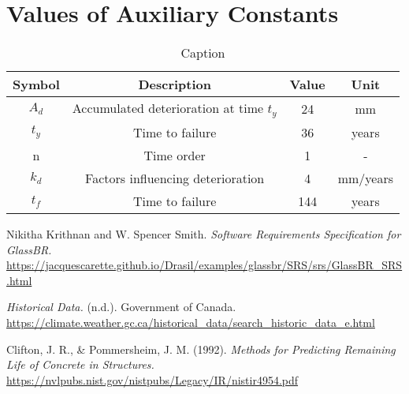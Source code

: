 \documentclass[12pt]{article}
\begin{document}
\section{Values of Auxiliary Constants}
\begin{table}[htbp]
    \centering
    \begin{tabular}{cccc}
    \hline        
    Symbol & Description & Value & Unit  \\
    \hline
    $A_d$ & Accumulated deterioration at time $t_y$ & 24 & mm \\
    $t_y$ & Time to failure  & 36 & years \\
    n & Time order  & 1 & - \\
    $k_d$ & Factors influencing deterioration  & 4 & mm/years \\
    $t_f$ & Time to failure & 144 & years \\
    \end{tabular}
    \caption{Caption}
    \label{tab:my_label}
\end{table}

\newpage

\begin{thebibliography}{9} %
Nikitha Krithnan and W. Spencer Smith. \textit{Software Requirements Specification for GlassBR.}
\url{https://jacquescarette.github.io/Drasil/examples/glassbr/SRS/srs/GlassBR_SRS.html}

\textit{Historical Data.} (n.d.). Government of Canada. \url{https://climate.weather.gc.ca/historical_data/search_historic_data_e.html}

Clifton, J. R., & Pommersheim, J. M. (1992). \textit{Methods for Predicting Remaining Life of Concrete in Structures.}
\url{https://nvlpubs.nist.gov/nistpubs/Legacy/IR/nistir4954.pdf}

\end{thebibliography}
\end{document}
